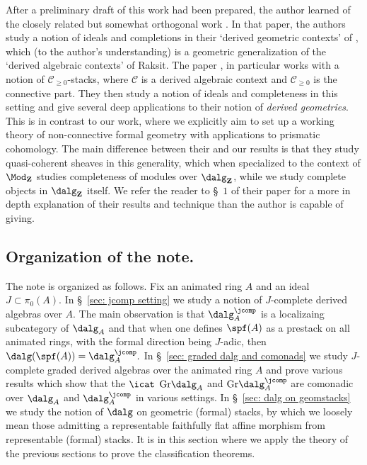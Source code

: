 \documentclass[10pt,reqno]{amsart}
\numberwithin{equation}{section}
\newcommand{\cC}{\mathcal{C}}
\newcommand{\ZZ}{\mathbf{Z}}
\newcommand{\Gr}{\mathrm{Gr}}
\begin{document}
After a preliminary draft of this work had been prepared, the author learned of the closely related but somewhat orthogonal work   \cite{GardnerHekking2025IdealsDerivedGeometries}. In that paper, the authors study a notion of ideals and completions in their `derived geometric contexts' of \cite{BenBassatHekking2025BlowUpsNormalBundles}, which (to the author's understanding) is a geometric generalization of the `derived algebraic contexts' of Raksit. The paper \cite{GardnerHekking2025IdealsDerivedGeometries}, in particular works with a notion of $\cC_{\geq 0}$-stacks, where $\cC$ is a derived algebraic context and $\cC_{\geq 0}$ is the connective part. They then study a notion of ideals and completeness in this setting and give several deep applications to their notion of \emph{derived geometries}. This is in contrast to our work, where we explicitly aim to set up a working theory of non-connective formal geometry with applications to prismatic cohomology. The main difference between their and our results is that they study quasi-coherent sheaves in this generality, which when specialized to the context of $\Mod_{\ZZ}$ studies completeness of modules over $\dalg_\ZZ$, while we study complete objects in $\dalg_{\ZZ}$ itself. We refer the reader to \S~$1$ of their paper for a more in depth explanation of their results and technique than the author is capable of giving.

\subsection{Organization of the note.}
The note is organized as follows. Fix an animated ring $A$ and an ideal $J\subset \pi_0(A)$. In \S~\ref{sec: jcomp setting} we study a notion of $J$-complete derived algebras over $A$. The main observation is that $\dalg_A^\jcomp$ is a localizaing subcategory of $\dalg_A$ and that when one defines $\spf(A)$ as a prestack on all animated rings, with the formal direction being $J$-adic, then $\dalg(\spf(A))=\dalg_A^\jcomp.$ In \S~\ref{sec: graded dalg and comonads} we study $J$-complete graded derived algebras over the animated ring $A$ and prove various results which show that the $\icat$ $\Gr\dalg_A$ and $\Gr\dalg_A^\jcomp$ are comonadic over $\dalg_A$ and $\dalg_A^\jcomp$ in various settings. 
In \S~\ref{sec: dalg on geomstacks} we study the notion of $\dalg$ on geometric (formal) stacks, by which we loosely mean those admitting a representable faithfully flat affine morphism from representable (formal) stacks. It is in this section where we apply the theory of the previous sections to prove the classification theorems.
\end{document}
